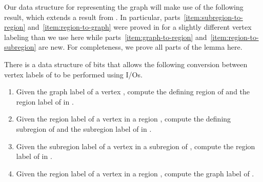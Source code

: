 Our data structure for representing the graph  will make use of
the following result, which extends a result from \cite{DBLP:journals/talg/BoseCHMM12}.
In particular, parts~\ref{item:subregion-to-region}
and~\ref{item:region-to-graph} were proved in \cite{DBLP:journals/talg/BoseCHMM12} for a slightly
different vertex labeling than we use here while
parts~\ref{item:graph-to-region} and~\ref{item:region-to-subregion} are new.
For completeness, we prove all parts of the lemma here.

\begin{lemma}
  \label{lem:label_ops}
  There is a data structure of  bits that allows the following
  conversion between vertex labels of  to be performed using
   I/Os.
  \begin{enumerate} \item Given the graph label  of a vertex , compute the defining
    region  of  and the region label  of  in
    .\label{item:graph-to-region}
  \item Given the region label  of a vertex  in a region
    , compute the defining subregion  of  and the
    subregion label  of  in
    .\label{item:region-to-subregion}
  \item Given the subregion label of a vertex  in a subregion
     of , compute the region label 
    of  in .\label{item:subregion-to-region}
  \item Given the region label of a vertex  in a region ,
    compute the graph label  of .\label{item:region-to-graph}
  \end{enumerate}
\end{lemma}


